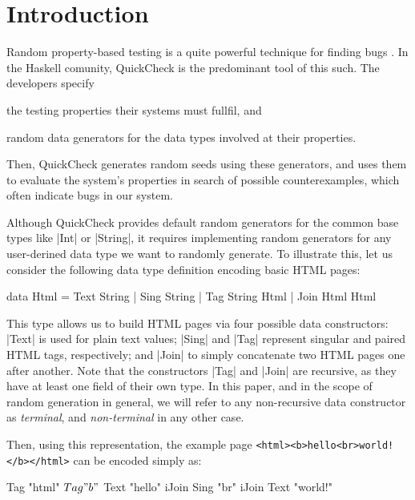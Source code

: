 \section{Introduction}
\label{sec:intro}

%
Random property-based testing is a quite powerful technique for finding bugs
\cite{ArtsHNS15, HughesPAN16, HughesNSA16}.
%
In the Haskell comunity, QuickCheck is the predominant tool of this such.
%
The developers specify
%
\begin{inparaenum}
\item the testing properties their systems must fullfil, and
\item random data generators for the data types involved at their properties.
\end{inparaenum}
%
Then, QuickCheck generates random seeds using these generators, and uses them to
evaluate the system's properties in search of possible counterexamples, which
often indicate bugs in our system.


%
Although QuickCheck provides default random generators for the common base types
like |Int| or |String|, it requires implementing random generators for any
user-derined data type we want to randomly generate.
%
%
To illustrate this, let us consider the following data type definition encoding
basic HTML pages:

\begin{code}
data Html
  =  Text  String
  |  Sing  String
  |  Tag   String Html
  |  Join  Html Html
\end{code}

This type allows us to build HTML pages via four possible data constructors:
|Text| is used for plain text values; |Sing| and |Tag| represent singular and
paired HTML tags, respectively; and |Join| to simply concatenate two HTML pages
one after another.
%
Note that the constructors |Tag| and |Join| are recursive, as they have at least
one field of their own type.
%
In this paper, and in the scope of random generation in general, we will refer
to any non-recursive data constructor as \emph{terminal}, and
\emph{non-terminal} in any other case.


Then, using this representation, the example page\linebreak
%
\texttt{<html><b>hello<br>world!</b></html>}
%
can be encoded simply as:
%
\begin{code}
Tag "html" $ Tag "b" $
  Text "hello" iJoin Sing "br" iJoin Text "world!"
\end{code} %


